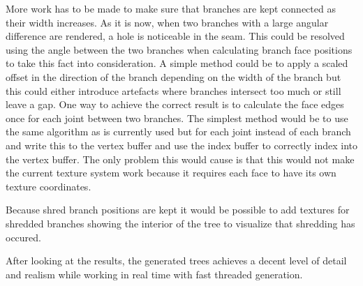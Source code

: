 \documentclass[11pt]{article} %
\begin{document}
More work has to be made to make sure that branches are kept connected as their width increases.
As it is now, when two branches with a large angular difference are rendered, a hole is noticeable in the seam.
This could be resolved using the angle between the two branches when calculating branch face positions to take this fact into consideration.
A simple method could be to apply a scaled offset in the direction of the branch depending on the width of the branch but this could either introduce artefacts where branches intersect too much or still leave a gap.
One way to achieve the correct result is to calculate the face edges once for each joint between two branches.
The simplest method would be to use the same algorithm as is currently used but for each joint instead of each branch and write this to the vertex buffer and use the index buffer to correctly index into the vertex buffer.
The only problem this would cause is that this would not make the current texture system work because it requires each face to have its own texture coordinates.

Because shred branch positions are kept it would be possible to add textures for shredded branches showing the interior of the tree to visualize that shredding has occured.

After looking at the results, the generated trees achieves a decent level of detail and realism while working in real time with fast threaded generation.



\end{document}
